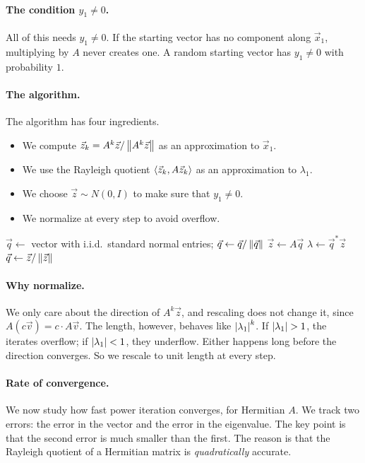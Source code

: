 \paragraph{The condition \texorpdfstring{$y_1 \ne 0$}{y1 ≠ 0}.} All of this needs $y_1 \ne 0$. If the starting vector has no component along $\vec{x}_1$, multiplying by $A$ never creates one. A random starting vector has $y_1 \ne 0$ with probability $1$.

\paragraph{The algorithm.} The algorithm has four ingredients.
\begin{itemize}
  \item We compute $\vec{z}_k = A^k\vec{z}/\left\lVert A^k\vec{z} \right\rVert$ as an approximation to $\vec{x}_1$.
  \item We use the Rayleigh quotient $\left\langle \vec{z}_k, A\vec{z}_k \right\rangle$ as an approximation to $\lambda_1$.
  \item We choose $\vec{z} \sim N(0, I)$ to make sure that $y_1 \ne 0$.
  \item We normalize at every step to avoid overflow.
\end{itemize}

\begin{algorithm}[H]
  \caption{Power iteration.}
  \label{alg:power}
  \begin{algorithmic}[1]
    \State $\vec{q} \gets$ vector with i.i.d.\ standard normal entries; $\vec{q} \gets \vec{q}/\left\lVert \vec{q} \right\rVert$
      \State $\vec{z} \gets A\vec{q}$
      \State $\lambda \gets \vec{q}^\ast\vec{z}$ 
      \State $\vec{q} \gets \vec{z}/\left\lVert \vec{z} \right\rVert$
    \EndFor
  \end{algorithmic}
\end{algorithm}

\paragraph{Why normalize.} We only care about the direction of $A^k\vec{z}$, and rescaling does not change it, since $A(c\vec{v}) = c \cdot A\vec{v}$. The length, however, behaves like $\left\lvert \lambda_1 \right\rvert^k$. If $\left\lvert \lambda_1 \right\rvert > 1$, the iterates overflow; if $\left\lvert \lambda_1 \right\rvert < 1$, they underflow. Either happens long before the direction converges. So we rescale to unit length at every step.

\paragraph{Rate of convergence.} We now study how fast power iteration converges, for Hermitian $A$. We track two errors: the error in the vector and the error in the eigenvalue. The key point is that the second error is much smaller than the first. The reason is that the Rayleigh quotient of a Hermitian matrix is \emph{quadratically} accurate.


